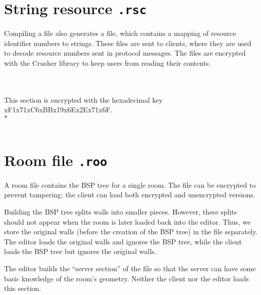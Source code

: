 \section{String resource {\tt .rsc}}

Compiling a \kod file also generates a \rsc file, which contains a
mapping of resource identifier numbers to strings.  These files are
sent to clients, where they are used to decode resource numbers sent
in protocol messages.  The files are encrypted with the Crusher
library to keep users from reading their contents.

\begin{protocol}
 \\
\\
This section is encrypted with the hexadecimal key
xF1x71xC6xBBx19x6Ex2Ex71x6F. \\
$*$ \\
\\
\end{protocol}

\section{Room file {\tt .roo}}

A room file contains the BSP tree for a single room.  The file can be
encrypted to prevent tampering; the client can load both encrypted and
unencrypted versions.

Building the BSP tree splits walls into smaller pieces.  However,
these splits should not appear when the room is later loaded back into
the editor.  Thus, we store the original walls (before the creation of
the BSP tree) in the file separately.  The editor loads the original
walls and ignores the BSP tree, while the client loads the BSP tree
but ignores the original walls.

The editor builds the ``server section'' of the file so that the
server can have some basic knowledge of the room's geometry.  Neither
the client nor the editor loads this section.

